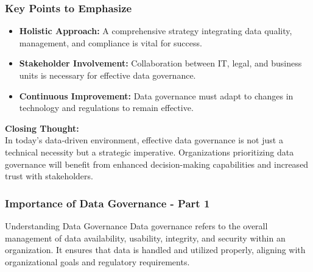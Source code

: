 \documentclass[aspectratio=169]{beamer}
\begin{document}
\begin{frame}[fragile]
    \frametitle{Key Points to Emphasize}
    
    \begin{itemize}
        \item \textbf{Holistic Approach:} A comprehensive strategy integrating data quality, management, and compliance is vital for success.
        \item \textbf{Stakeholder Involvement:} Collaboration between IT, legal, and business units is necessary for effective data governance.
        \item \textbf{Continuous Improvement:} Data governance must adapt to changes in technology and regulations to remain effective.
    \end{itemize}

    \textbf{Closing Thought:} \\ 
    In today's data-driven environment, effective data governance is not just a technical necessity but a strategic imperative. Organizations prioritizing data governance will benefit from enhanced decision-making capabilities and increased trust with stakeholders.
\end{frame}

\begin{frame}[fragile]
    \frametitle{Importance of Data Governance - Part 1}
    \begin{block}{Understanding Data Governance}
        Data governance refers to the overall management of data availability, usability, integrity, and security within an organization. 
        It ensures that data is handled and utilized properly, aligning with organizational goals and regulatory requirements.
    \end{block}
\end{frame}
\end{document}
